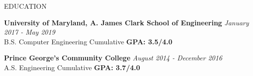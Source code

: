 \documentclass{resume} %
\begin{document}

\begin {rSection}{\small EDUCATION}

\small %

{\bf University of Maryland, A. James Clark School of Engineering} \hfill {\em January 2017 - May 2019 }
\\ B.S. Computer Engineering  \hfill {Cumulative \textbf{GPA: 3.5/4.0}}

{\bf Prince George’s Community College } \hfill {\em August 2014 - December 2016}
\\ A.S. Engineering \hfill {Cumulative \textbf{GPA: 3.7/4.0}}


\end{rSection}




\end{document}
